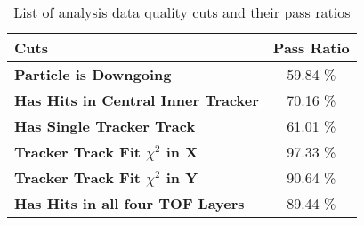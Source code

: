 \begin{table}[ht]
\renewcommand\arraystretch{1.3}
\centering
\caption{List of analysis data quality cuts and their pass ratios}
\label{analysis data quality cuts}
\begin{tabular}{lc}
\hline
Cuts  & Pass Ratio \\
\hline
\textbf{Particle is Downgoing}                                               & 59.84 \% \\
\textbf{Has Hits in Central Inner Tracker}                              & 70.16 \% \\
\textbf{Has Single Tracker Track}                                        & 61.01 \% \\
\textbf{Tracker Track Fit $\chi^2$ in X}                                       & 97.33 \% \\
\textbf{Tracker Track Fit $\chi^2$ in Y}                                     & 90.64 \% \\
\textbf{Has Hits in all four TOF Layers}                                   & 89.44 \% \\
\hline
\end{tabular}
\end{table}           

